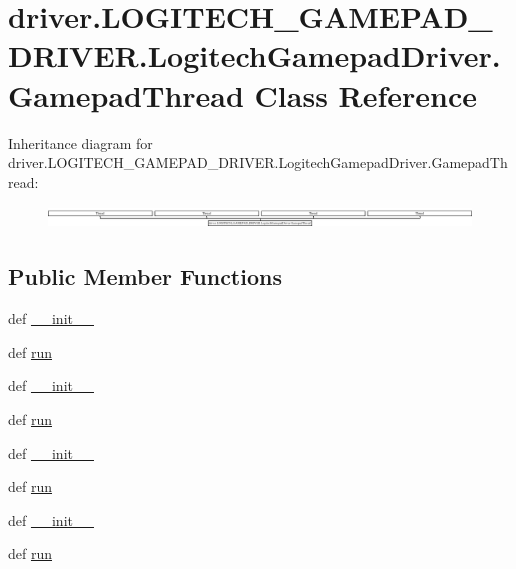 \hypertarget{classdriver_1_1LOGITECH__GAMEPAD__DRIVER_1_1LogitechGamepadDriver_1_1GamepadThread}{}\section{driver.\+L\+O\+G\+I\+T\+E\+C\+H\+\_\+\+G\+A\+M\+E\+P\+A\+D\+\_\+\+D\+R\+I\+V\+E\+R.\+Logitech\+Gamepad\+Driver.\+Gamepad\+Thread Class Reference}
\label{classdriver_1_1LOGITECH__GAMEPAD__DRIVER_1_1LogitechGamepadDriver_1_1GamepadThread}
Inheritance diagram for driver.\+L\+O\+G\+I\+T\+E\+C\+H\+\_\+\+G\+A\+M\+E\+P\+A\+D\+\_\+\+D\+R\+I\+V\+E\+R.\+Logitech\+Gamepad\+Driver.\+Gamepad\+Thread\+:\begin{figure}[H]
\begin{center}
\leavevmode
\includegraphics[height=0.583333cm]{classdriver_1_1LOGITECH__GAMEPAD__DRIVER_1_1LogitechGamepadDriver_1_1GamepadThread}
\end{center}
\end{figure}
\subsection*{Public Member Functions}
\begin{DoxyCompactItemize}
\item 
def \hyperlink{classdriver_1_1LOGITECH__GAMEPAD__DRIVER_1_1LogitechGamepadDriver_1_1GamepadThread_aa08ed3fd5770b7518dd3c3672adb37d3}{\+\_\+\+\_\+init\+\_\+\+\_\+}
\item 
def \hyperlink{classdriver_1_1LOGITECH__GAMEPAD__DRIVER_1_1LogitechGamepadDriver_1_1GamepadThread_a1081a12fcf001359ba0755676ef9db77}{run}
\item 
def \hyperlink{classdriver_1_1LOGITECH__GAMEPAD__DRIVER_1_1LogitechGamepadDriver_1_1GamepadThread_aa08ed3fd5770b7518dd3c3672adb37d3}{\+\_\+\+\_\+init\+\_\+\+\_\+}
\item 
def \hyperlink{classdriver_1_1LOGITECH__GAMEPAD__DRIVER_1_1LogitechGamepadDriver_1_1GamepadThread_a1081a12fcf001359ba0755676ef9db77}{run}
\item 
def \hyperlink{classdriver_1_1LOGITECH__GAMEPAD__DRIVER_1_1LogitechGamepadDriver_1_1GamepadThread_aa08ed3fd5770b7518dd3c3672adb37d3}{\+\_\+\+\_\+init\+\_\+\+\_\+}
\item 
def \hyperlink{classdriver_1_1LOGITECH__GAMEPAD__DRIVER_1_1LogitechGamepadDriver_1_1GamepadThread_a1081a12fcf001359ba0755676ef9db77}{run}
\item 
def \hyperlink{classdriver_1_1LOGITECH__GAMEPAD__DRIVER_1_1LogitechGamepadDriver_1_1GamepadThread_aa08ed3fd5770b7518dd3c3672adb37d3}{\+\_\+\+\_\+init\+\_\+\+\_\+}
\item 
def \hyperlink{classdriver_1_1LOGITECH__GAMEPAD__DRIVER_1_1LogitechGamepadDriver_1_1GamepadThread_a1081a12fcf001359ba0755676ef9db77}{run}
\end{DoxyCompactItemize}
